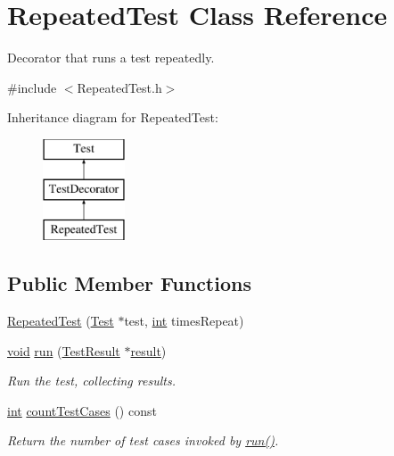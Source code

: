 \hypertarget{class_repeated_test}{\section{Repeated\-Test Class Reference}
\label{class_repeated_test}
}


Decorator that runs a test repeatedly.  




{\ttfamily \#include $<$Repeated\-Test.\-h$>$}

Inheritance diagram for Repeated\-Test\-:\begin{figure}[H]
\begin{center}
\leavevmode
\includegraphics[height=3.000000cm]{class_repeated_test}
\end{center}
\end{figure}
\subsection*{Public Member Functions}
\begin{DoxyCompactItemize}
\item 
\hyperlink{class_repeated_test_a73cf84a81085a1e93f21f2f4d2a14bc6}{Repeated\-Test} (\hyperlink{class_test}{Test} $\ast$test, \hyperlink{wglew_8h_a500a82aecba06f4550f6849b8099ca21}{int} times\-Repeat)
\item 
\hyperlink{wglew_8h_aeea6e3dfae3acf232096f57d2d57f084}{void} \hyperlink{class_repeated_test_a6faffcd29b619305a75dd4c1995beaad}{run} (\hyperlink{class_test_result}{Test\-Result} $\ast$\hyperlink{glew_8h_a5fb5836a37f7607602a16ad733ed6357}{result})
\begin{DoxyCompactList}\small\item\em Run the test, collecting results. \end{DoxyCompactList}\item 
\hyperlink{wglew_8h_a500a82aecba06f4550f6849b8099ca21}{int} \hyperlink{class_repeated_test_a2bacf360b91cc6a0c52ec9e75ceae5a6}{count\-Test\-Cases} () const 
\begin{DoxyCompactList}\small\item\em Return the number of test cases invoked by \hyperlink{class_repeated_test_a6faffcd29b619305a75dd4c1995beaad}{run()}. \end{DoxyCompactList}\end{DoxyCompactItemize}
